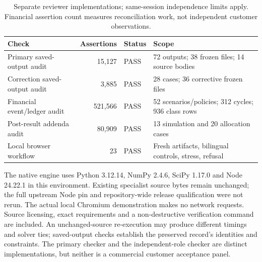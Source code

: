\begin{table}[H]\small\centering\begin{tabular}{p{.26\linewidth}rp{.1\linewidth}p{.39\linewidth}}\toprule
Check & Assertions & Status & Scope \\\midrule
Primary saved-output audit & 15,127 & PASS & 72 outputs; 38 frozen files; 14 source bodies \\
Correction saved-output audit & 3,885 & PASS & 28 cases; 36 corrective frozen files \\
Financial event/ledger audit & 521,566 & PASS & 52 scenarios/policies; 312 cycles; 936 class rows \\
Post-result addenda audit & 80,909 & PASS & 13 simulation and 20 allocation cases \\
Local browser workflow & 23 & PASS & Fresh artifacts, bilingual controls, stress, refusal \\
\bottomrule\end{tabular}\caption{Separate reviewer implementations; same-session independence limits apply. Financial assertion count measures reconciliation work, not independent customer observations.}\end{table}
The native engine uses Python 3.12.14, NumPy 2.4.6, SciPy 1.17.0 and Node 24.22.1 in this environment. Existing specialist source bytes remain unchanged; the full upstream Node pin and repository-wide release qualification were not rerun. The actual local Chromium demonstration makes no network requests. Source licensing, exact requirements and a non-destructive verification command are included. An unchanged-source re-execution may produce different timings and solver ties; saved-output checks establish the preserved record's identities and constraints. The primary checker and the independent-role checker are distinct implementations, but neither is a commercial customer acceptance panel.
